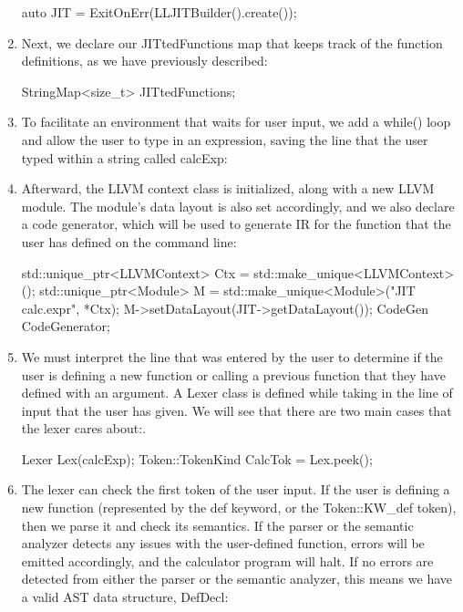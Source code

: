 \begin{enumerate}
\begin{cpp}
auto JIT = ExitOnErr(LLJITBuilder().create());
\end{cpp}

\item
Next, we declare our JITtedFunctions map that keeps track of the function definitions, as we have previously described:

\begin{cpp}
StringMap<size_t> JITtedFunctions;
\end{cpp}

\item
To facilitate an environment that waits for user input, we add a while() loop and allow the user to type in an expression, saving the line that the user typed within a string called calcExp:

\begin{cpp}
    while (true) {
        outs() << "JIT calc > ";
        std::string calcExp;
        std::getline(std::cin, calcExp);
\end{cpp}

\item
Afterward, the LLVM context class is initialized, along with a new LLVM module. The module’s data layout is also set accordingly, and we also declare a code generator, which will be used to generate IR for the function that the user has defined on the command line:

\begin{cpp}
    std::unique_ptr<LLVMContext> Ctx = std::make_unique<LLVMContext>();
    std::unique_ptr<Module> M = std::make_unique<Module>("JIT calc.expr", *Ctx);
    M->setDataLayout(JIT->getDataLayout());
    CodeGen CodeGenerator;
\end{cpp}

\item
We must interpret the line that was entered by the user to determine if the user is defining a new function or calling a previous function that they have defined with an argument. A Lexer class is defined while taking in the line of input that the user has given. We will see that there are two main cases that the lexer cares about:.

\begin{cpp}
    Lexer Lex(calcExp);
    Token::TokenKind CalcTok = Lex.peek();
\end{cpp}

\item
The lexer can check the first token of the user input. If the user is defining a new function (represented by the def keyword, or the Token::KW\_def token), then we parse it and check its semantics. If the parser or the semantic analyzer detects any issues with the user-defined function, errors will be emitted accordingly, and the calculator program will halt. If no errors are detected from either the parser or the semantic analyzer, this means we have a valid AST data structure, DefDecl:


\end{enumerate}
